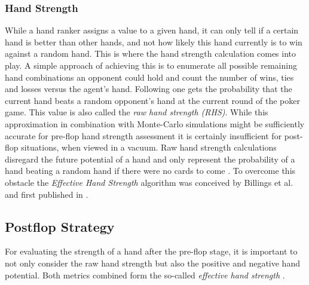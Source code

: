 \subsubsection{Hand Strength}
\label{subsubsec:hs}
While a hand ranker assigns a value to a given hand, it can only tell if a certain hand is better than other hands, and not how likely this hand currently is to win against a random hand. This is where the hand strength calculation comes into play. A simple approach of achieving this is to enumerate all possible remaining hand combinations an opponent could hold and count the number of wins, ties and losses versus the agent's hand. Following  one gets the probability that the current hand beats a random opponent's hand at the current round of the poker game. This value is also called the \textit{raw hand strength (RHS)}. While this approximation in combination with Monte-Carlo simulations might be sufficiently accurate for pre-flop hand strength assessment it is certainly insufficient for post-flop situations, when viewed in a vacuum. Raw hand strength calculations disregard the future potential of a hand and only represent the probability of a hand beating a random hand if there were no cards to come \cite{opp_master}. To overcome this obstacle the \textit{Effective Hand Strength} algorithm was conceived by Billings et al. and first published in \cite{opp_modeling}.
\subsection{Postflop Strategy}
For evaluating the strength of a hand after the pre-flop stage, it is important to not only consider the raw hand strength but also the positive and negative hand potential. Both metrics combined form the so-called \textit{effective hand strength} \cite{pena}.
